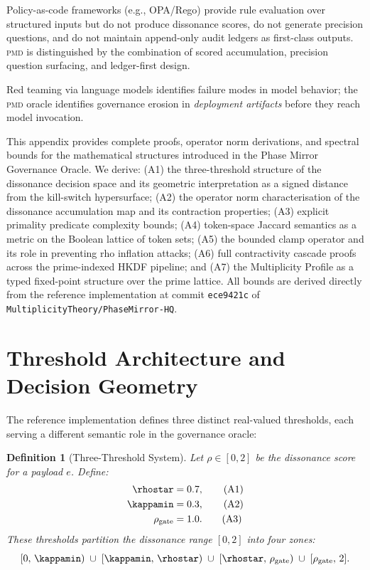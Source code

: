 \documentclass[11pt,letterpaper]{article}
\newtheorem{definition}[theorem]{Definition}
\theoremstyle{remark}
\newcommand{\pmd}{\textsc{pmd}}
\newcommand{\rhogate}{\rho_{\mathrm{gate}}}
\newcommand{\rhosys}{\rho}
\begin{document}
Policy-as-code frameworks (e.g., OPA/Rego) provide rule evaluation over
structured inputs but do not produce dissonance scores, do not generate
precision questions, and do not maintain append-only audit ledgers as
first-class outputs.  \pmd{} is distinguished by the combination of
scored accumulation, precision question surfacing, and ledger-first
design.

Red teaming via language models \cite{perez2022red} identifies failure
modes in model behavior; the \pmd{} oracle identifies governance erosion
in \emph{deployment artifacts} before they reach model invocation.

\appendix
This appendix provides complete proofs, operator norm derivations, and
spectral bounds for the mathematical structures introduced in the Phase
Mirror Governance Oracle.  We derive: (A1) the three-threshold structure
of the dissonance decision space and its geometric interpretation as a
signed distance from the kill-switch hypersurface; (A2) the operator norm
characterisation of the dissonance accumulation map and its contraction
properties; (A3) explicit primality predicate complexity bounds; (A4)
token-space Jaccard semantics as a metric on the Boolean lattice of token
sets; (A5) the bounded clamp operator and its role in preventing rho
inflation attacks; (A6) full contractivity cascade proofs across the
prime-indexed HKDF pipeline; and (A7) the Multiplicity Profile as a
typed fixed-point structure over the prime lattice.  All bounds are
derived directly from the reference implementation at commit
\texttt{ece9421c} of \texttt{MultiplicityTheory/PhaseMirror-HQ}.


\section{Threshold Architecture and Decision Geometry}
\label{sec:thresholds}

The reference implementation defines three distinct real-valued thresholds,
each serving a different semantic role in the governance oracle:

\begin{definition}[Three-Threshold System]
\label{def:thresholds}
Let $\rhosys \in [0, 2]$ be the dissonance score for a payload $e$.
Define:
\begin{align}
  \rhostar        &= 0.7, \tag{A1}\\
  \kappamin       &= 0.3, \tag{A2}\\
  \rhogate        &= 1.0. \tag{A3}
\end{align}
These thresholds partition the dissonance range $[0,2]$ into four zones:
\[
  [0,\, \kappamin) \;\cup\;
  [\kappamin,\, \rhostar) \;\cup\;
  [\rhostar,\, \rhogate) \;\cup\;
  [\rhogate,\, 2].
\]
\end{definition}
\end{document}
